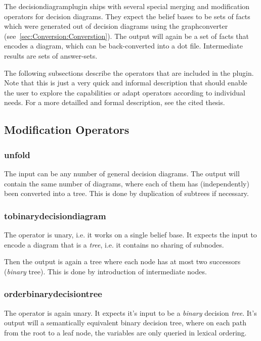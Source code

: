\documentclass[a4paper,11pt]{article}
\theoremstyle{definition}
\newcommand{\dotff}{\textsf{dot}\xspace }
\newcommand{\inlinecode}[1]{\textsf{#1}\xspace }
\begin{document}
		The decisiondiagramplugin ships with several special merging and modification operators for decision diagrams. They expect the belief bases to be sets of facts which were
		generated out of decision diagrams using the \inlinecode{graphconverter} (see~\ref{sec:Conversion:Converstion}). The output will again be a set of facts that encodes a diagram,
		which can be back-converted into a \dotff file. Intermediate results are sets of answer-sets.

		The following subsections describe the operators that are included in the plugin. Note that this is just a very quick and informal description that should enable the user
		to explore the capabilities or adapt operators according to individual needs. For a more detailled and formal description, see the cited thesis.

		\subsection{Modification Operators}
		\label{sec:Operators:Modification}

			\subsubsection{unfold}
			
				The input can be any number of general decision diagrams. The output will contain the same number of diagrams, where each of them has (independently) been converted
				into a tree. This is done by duplication of subtrees if necessary.
			

			\subsubsection{tobinarydecisiondiagram}
			
				The operator is unary, i.e. it works on a single belief base. It expects the input to encode a diagram that is a \emph{tree}, i.e. it contains no sharing of subnodes.
				
				Then the output is again a tree where each node has at most two successors (\emph{binary} tree). This is done by introduction of intermediate nodes.

				
			\subsubsection{orderbinarydecisiontree}
			
				The operator is again unary. It expects it's input to be a \emph{binary} decision \emph{tree}. It's output will a semantically equivalent binary decision tree, where
				on each path from the root to a leaf node, the variables are only queried in lexical ordering.
\end{document}
